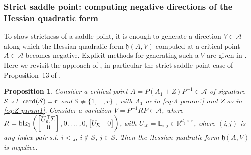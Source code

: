 \documentclass{article}
\newtheorem{proposition}{Proposition}
\def\block{{\rm blk}}
\newcommand{\1}{\mathds{1}}
\begin{document}
\subsubsection{Strict saddle point: computing negative directions of the Hessian quadratic form}

To show strictness of a saddle point, it is enough to generate a direction $ V \in \mathcal{A}$ along which the Hessian quadratic form $ \mathfrak{h}(A,V)$ computed at a critical point $ A \in \mathcal{A}$ becomes negative. 
Explicit methods for generating such a $V$ are given in \cite{achour2021loss, chitour2018geometric}.
Here we revisit the approach of \cite{achour2021loss}, in particular the strict saddle point case of Proposition~13 of \cite{achour2021loss}.

\begin{proposition}
\label{prop:var-neg-Hessian}
Consider a critical point $  A = P(A_1 +Z ) P^{-1} \in \mathcal{A}$ of signature $ \mathcal{S} $ s.t. $ {\rm card}(\mathcal{S} )=r $ and $ \mathcal{S}\neq \{1, \ldots, r\}$ , with $A_1 $ as in \eqref{eq:A-param1} and $ Z $ as in \eqref{eq:Z-param1}. Consider a variation $ V = P^{-1}  R  P \in \mathcal{A}$, where
$
R =  \block_1 \left( \begin{bmatrix} U_\mathcal{K}^\top  \Sigma  \\ 0 \end{bmatrix}, 0,  \ldots , 0, 
 \begin{bmatrix} U_\mathcal{K} & 0 \end{bmatrix} \right)
$, with $ U_\mathcal{K} =  \mathbb{E}_{i,j} \in \mathbb{R}^{d_y \times r} $, where $ (i, j)$ is any index pair s.t. $ i<j$, $ i \notin \mathcal{S} $, $ j \in \mathcal{S} $.
Then the Hessian quadratic form $ \mathfrak{h}(A,V)$ is negative.
\end{proposition}
\end{document}
